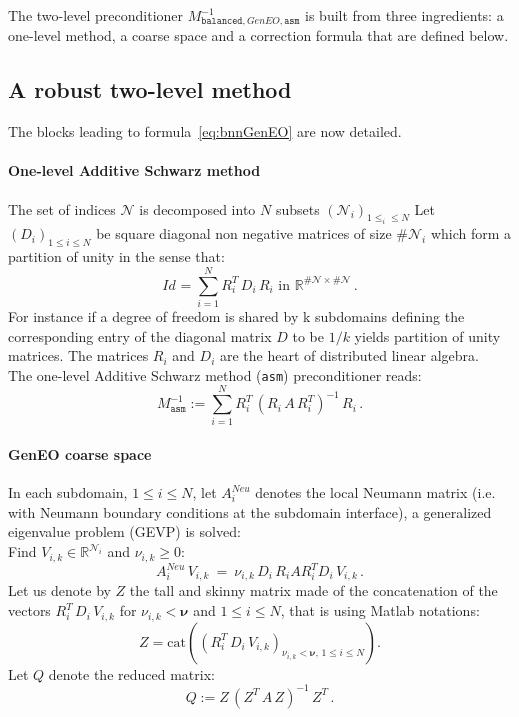 \documentclass{article}
\def \R {\mathbb R}
\begin{document}
 \bigskip
 
The two-level preconditioner $M_{\texttt{balanced},GenEO,\texttt{asm}}^{-1}$ is built from three ingredients: a one-level method, a coarse space and a correction formula that are defined below. 

\subsection{A robust two-level method}
	\label{sec:geneoCS}
The blocks leading to formula~\eqref{eq:bnnGenEO} are now detailed. 
\paragraph{One-level Additive Schwarz method}
The set of indices ${\mathcal N}$ is decomposed into $N$ subsets $({\mathcal N}_i)_{1\le _i\le N}$
Let $(D_i)_{1\le i \le N}$ be square diagonal non negative matrices of size $\#{\mathcal N}_i$ which form a partition of unity in the sense that:
\[
Id_{} = \sum_{i=1}^N R_i^T\,D_i\,R_i\text{ in }\R^{\#{\mathcal N}\times \#{\mathcal N}} \,.
\]
For instance if a degree of freedom is shared by k subdomains defining the corresponding entry of the diagonal matrix $D$ to be $1/k$ yields partition of unity matrices. The matrices $R_i$ and $D_i$ are the heart of distributed linear algebra.\\
 The one-level Additive Schwarz method (\texttt{asm}) preconditioner reads:
 \begin{equation}
    \label{eq:ASM}\boxed{
    M_{\texttt{asm}}^{-1} := \sum_{i=1}^N R_i^T\,(R_i\,A\,R_i^T)^{-1}\,R_i\,.
    }
 \end{equation}

\paragraph{GenEO coarse space}
In each subdomain, $1\le i\le N$, let $A^{Neu}_i$ denotes the local Neumann matrix (i.e. with Neumann boundary conditions at the subdomain interface),  a generalized eigenvalue problem (GEVP) is solved:\\
Find ${V_{i,k}} \in \R^{\mathcal{N}_i}$
and ${\nu_{i,k}} \ge 0$:
\begin{equation}
  \label{eq:gevpgeneo}
  \boxed{
 A^{Neu}_i\, {V_{i,k}}
  \ =\ \nu_{i,k}\,  {D_i\, R_i A R_i^T D_i}\,{V_{i,k}}\,. 
  } 
\end{equation}
Let us denote by $Z$ the tall and skinny matrix made of the concatenation of the vectors $R_i^T\,D_i\,V_{i,k}$ for $\nu_{i,k}<\boldsymbol{\nu}$ and $1\le i\le N$, that is using Matlab notations:
\begin{equation}
  \label{eq:GenEOCS}
 \boxed{
	Z=\text{cat}((R_i^T\,D_i\,V_{i,k})_{\nu_{i,k}<\boldsymbol{\nu},\,1\le i\le N}).
}
\end{equation}
Let $Q$ denote the reduced matrix:
\begin{equation}
  \label{eq:reducedmatrix}
  \boxed{
  Q := Z\,(Z^T\,A\,Z)^{-1}\,Z^T\,.
  }
\end{equation}
\end{document}
